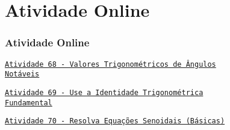 \section{Atividade Online}
\begin{frame}
\frametitle{Atividade Online} 

\href{https://pt.khanacademy.org/math/trigonometry/unit-circle-trig-func/trig-values-special-angles/e/trigonometric-functions-of-special-angles}
{{\tt Atividade 68 - Valores Trigonométricos de Ângulos \\ Notáveis}}

\href{https://pt.khanacademy.org/math/trigonometry/unit-circle-trig-func/pythagorean-identity/e/circles-and-pythagorean-identities}
{{\tt Atividade 69 - Use a Identidade Trigonométrica \\ Fundamental}}

\href{https://pt.khanacademy.org/math/trigonometry/trig-equations-and-identities/basic-sinusoidal-equations/e/solve-basic-sinusoidal-equations}
{{\tt Atividade 70 - Resolva Equações Senoidais (Básicas)}}




\end{frame}

